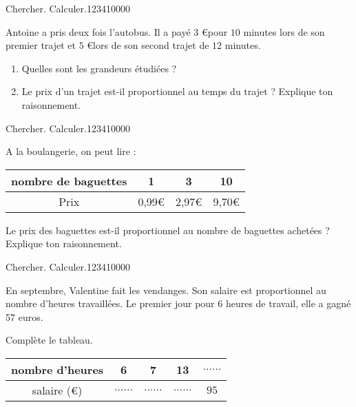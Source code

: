 \begin{pageAuto}
 
\begin{ExoAuto}{Chercher. Calculer.}{1234}{1}{0}{0}{0}{0}
 
Antoine a pris deux fois l'autobus. Il a payé $3$ \euro pour $10$ minutes lors de son premier trajet et $5$ \euro lors de son second trajet de $12$ minutes. 
\begin{enumerate}[leftmargin=*]
\item Quelles sont les grandeurs étudiées ? 
\item Le prix d'un trajet est-il proportionnel au temps du trajet ? Explique ton raisonnement.
\end{enumerate}

\end{ExoAuto}

\begin{ExoAuto}{Chercher. Calculer.}{1234}{1}{0}{0}{0}{0}

A la boulangerie, on peut lire :
\begin{center}
\begin{tabular}{|c|c|c|c|}
\hline 
nombre de baguettes & 1 & 3 & 10 \\ 
\hline 
Prix  & 0,99\euro & 2,97\euro & 9,70\euro \\ 
\hline 
\end{tabular} 
\end{center}
Le prix des baguettes est-il proportionnel au nombre de baguettes achetées ? Explique ton raisonnement.

 

\end{ExoAuto}

\begin{ExoAuto}{Chercher. Calculer.}{1234}{1}{0}{0}{0}{0}

 

En septembre, Valentine fait les vendanges. Son salaire est proportionnel au nombre d'heures travaillées. Le premier jour pour 6 heures de travail, elle a gagné 57 euros.

 Complète le tableau.

\begin{center}
\begin{tabular}{|c|c|c|c|c|}
\hline 
nombre d'heures & 6 & 7 & 13 & $\ldots\ldots$ \\ 
\hline 
salaire (\euro) & $\ldots\ldots$ & $\ldots\ldots$   & $\ldots\ldots$  & $95$   \\ 
\hline 
\end{tabular} 
\end{center}
 
  
\end{ExoAuto}

 
\end{pageAuto}
\begin{pageBrouillon} 
 

\end{pageBrouillon}


